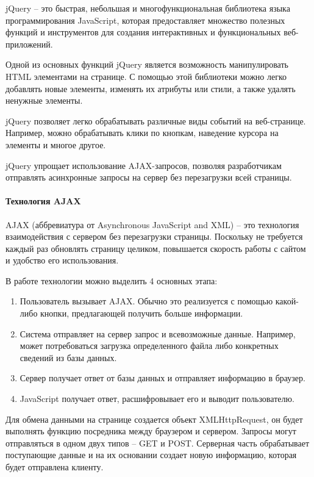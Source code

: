 jQuery -- это быстрая, небольшая и многофункциональная библиотека языка программирования JavaScript, которая предоставляет множество полезных функций и инструментов для создания интерактивных и функциональных веб-приложений.

Одной из основных функций jQuery является возможность манипулировать HTML элементами на странице. С помощью этой библиотеки можно легко добавлять новые элементы, изменять их атрибуты или стили, а также удалять ненужные элементы.

jQuery позволяет легко обрабатывать различные виды событий на веб-странице. Например, можно обрабатывать клики по кнопкам, наведение курсора на элементы и многое другое.

jQuery упрощает использование AJAX-запросов, позволяя разработчикам отправлять асинхронные запросы на сервер без перезагрузки всей страницы.

\paragraph{Технология AJAX}

AJAX (аббревиатура от Asynchronous JavaScript and XML) – это технология взаимодействия с сервером без перезагрузки страницы. Поскольку не требуется каждый раз обновлять страницу целиком, повышается скорость работы с сайтом и удобство его использования.

В работе технологии можно выделить 4 основных этапа:
\begin{enumerate}
	\item Пользователь вызывает AJAX. Обычно это реализуется с помощью какой-либо кнопки, предлагающей получить больше информации.
	\item Система отправляет на сервер запрос и всевозможные данные. Например, может потребоваться загрузка определенного файла либо конкретных сведений из базы данных.
	\item Сервер получает ответ от базы данных и отправляет информацию в браузер.
	\item JavaScript получает ответ, расшифровывает его и выводит пользователю.
\end{enumerate}

Для обмена данными на странице создается объект XMLHttpRequest, он будет выполнять функцию посредника между браузером и сервером. Запросы могут отправляться в одном двух типов – GET и POST. Серверная часть обрабатывает поступающие данные и на их основании создает новую информацию, которая будет отправлена клиенту.

